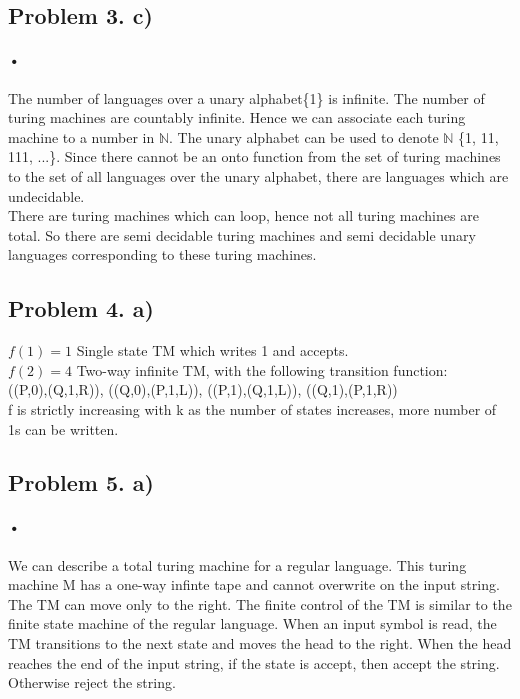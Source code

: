 \documentclass[12pt]{article}
\begin{document}
\subsection{Problem 3. c)}
\paragraph{•}
		The number of languages over a unary alphabet\{1\} is infinite. The number of turing machines are countably infinite. Hence we can associate each turing machine to a number in $\mathbb{N}$. The unary alphabet can be used to denote $\mathbb{N}$ \{1, 11, 111, ...\}. Since there cannot be an onto function from the set of turing machines to the set of all languages over the unary alphabet, there are languages which are undecidable. \\
		
		There are turing machines which can loop, hence not all turing machines are total. So there are semi decidable turing machines and semi decidable unary languages corresponding to these turing machines.\\
		
\subsection{Problem 4. a)}

	\(f(1) = 1\) Single state TM which writes 1 and accepts.\\
	\(f(2) = 4\) Two-way infinite TM, with the following transition function:\\
		((P,0),(Q,1,R)), 	((Q,0),(P,1,L)), 	((P,1),(Q,1,L)), 	((Q,1),(P,1,R))\\
			f is strictly increasing with k as the number of states increases, more number of 1s can be written.\\
			
\subsection{Problem 5. a)}
\paragraph{•}
	We can describe a total turing machine for a regular language. This turing machine M has a one-way infinte tape and cannot overwrite on the input string. The TM can move only to the right. The finite control of the TM is similar to the finite state machine of the regular language. When an input symbol is read, the TM transitions to the next state and moves the head to the right. When the head reaches the end of the input string, if the state is accept, then accept the string. Otherwise reject the string.\\
	
\end{document}
